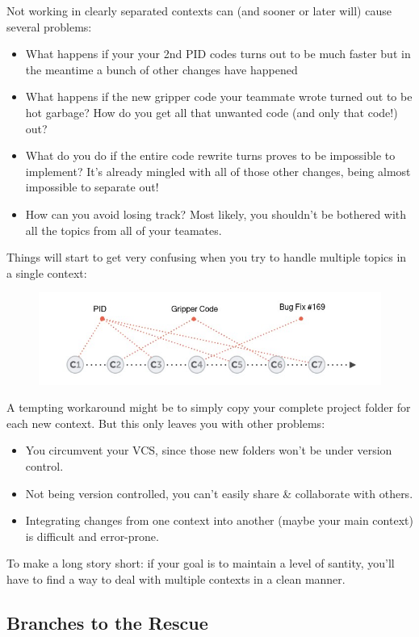 \documentclass{article}
\begin{document}
Not working in clearly separated contexts can (and sooner or later will) cause several problems:
\begin{itemize}
    \item What happens if your your 2nd PID codes turns out to be much faster but in the meantime a bunch of other changes have happened
    \item What happens if the new gripper code your teammate wrote turned out to be hot garbage? How do you get all that unwanted code (and only that code!) out?
    \item What do you do if the entire code rewrite turns proves to be impossible to implement? It's already mingled with all of those other changes, being almost impossible to separate out!
    \item How can you avoid losing track? Most likely, you shouldn't be bothered with all the topics from all of your teamates.
\end{itemize}
Things will start to get very confusing when you try to handle multiple topics in a single context:
\begin{figure}[h]
    \centering
    \includegraphics[width=4.5in]{images/one-context.jpg}
\end{figure}


A tempting workaround might be to simply copy your complete project folder for each new context. But this only leaves you with other problems:
\begin{itemize}
    \item You circumvent your VCS, since those new folders won't be under version control.
    \item Not being version controlled, you can't easily share \& collaborate with others.
    \item Integrating changes from one context into another (maybe your main context) is difficult and error-prone.
\end{itemize}

To make a long story short: if your goal is to maintain a level of santity, you'll have to find a way to deal with multiple contexts in a clean manner.

\subsection{Branches to the Rescue}
\end{document}
